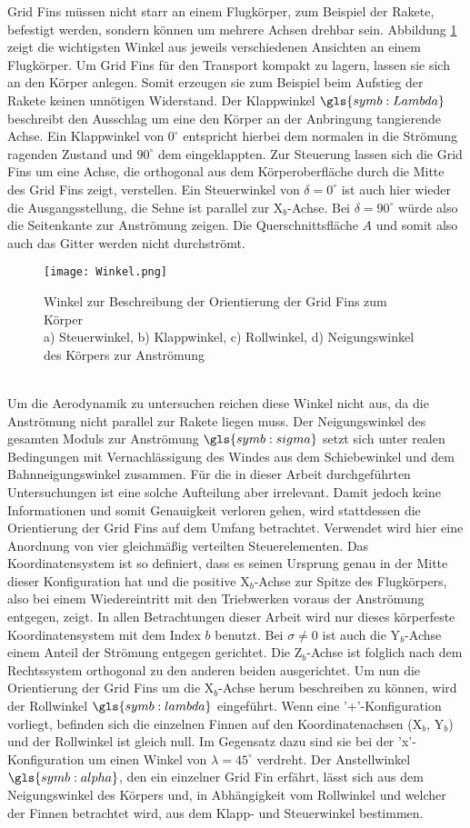 Grid Fins müssen nicht starr an einem Flugkörper, zum Beispiel der Rakete, befestigt werden, sondern können um mehrere Achsen drehbar sein. Abbildung \ref{abb_winkel} zeigt die wichtigsten Winkel aus jeweils verschiedenen Ansichten an einem Flugkörper. Um Grid Fins für den Transport kompakt zu lagern, lassen sie sich an den Körper anlegen. Somit erzeugen sie zum Beispiel beim Aufstieg der Rakete keinen unnötigen Widerstand. Der Klappwinkel $\gls{symb:Lambda}$ beschreibt den Ausschlag um eine den Körper an der Anbringung tangierende Achse. Ein Klappwinkel von $0^\circ$ entspricht hierbei dem normalen in die Strömung ragenden Zustand und $90^\circ$ dem eingeklappten. Zur Steuerung lassen sich die Grid Fins um eine Achse, die orthogonal aus dem Körperoberfläche durch die Mitte des Grid Fins zeigt, verstellen. Ein Steuerwinkel von $\delta = 0^\circ$ ist auch hier wieder die Ausgangsstellung, die Sehne ist parallel zur X$_b$-Achse. Bei $\delta = 90^\circ$ würde also die Seitenkante zur Anströmung zeigen. Die Querschnittsfläche $A$ und somit also auch das Gitter werden nicht durchströmt.
\begin{figure}[h]
	\centering
	\texttt{[image: Winkel.png]}
	\caption{Winkel zur Beschreibung der Orientierung der Grid Fins zum Körper\\a) Steuerwinkel, b) Klappwinkel, c) Rollwinkel, d) Neigungswinkel des Körpers zur Anströmung}
	\label{abb_winkel}
\end{figure}\\
Um die Aerodynamik zu untersuchen reichen diese Winkel nicht aus, da die Anströmung nicht parallel zur Rakete liegen muss. Der Neigungswinkel des gesamten Moduls zur Anströmung $\gls{symb:sigma}$ setzt sich unter realen Bedingungen mit Vernachlässigung des Windes aus dem Schiebewinkel und dem Bahnneigungswinkel zusammen. Für die in dieser Arbeit durchgeführten Untersuchungen ist eine solche Aufteilung aber irrelevant. Damit jedoch keine Informationen und somit Genauigkeit verloren gehen, wird stattdessen die Orientierung der Grid Fins auf dem Umfang betrachtet. Verwendet wird hier eine Anordnung von vier gleichmäßig verteilten Steuerelementen. Das Koordinatensystem ist so definiert, dass es seinen Ursprung genau in der Mitte dieser Konfiguration hat und die positive X$_b$-Achse zur Spitze des Flugkörpers, also bei einem Wiedereintritt mit den Triebwerken voraus der Anströmung entgegen, zeigt. In allen Betrachtungen dieser Arbeit wird nur dieses körperfeste Koordinatensystem mit dem Index $b$ benutzt. Bei $\sigma \neq 0$ ist auch die Y$_b$-Achse einem Anteil der Strömung entgegen gerichtet. Die Z$_b$-Achse ist folglich nach dem Rechtssystem orthogonal zu den anderen beiden ausgerichtet. Um nun die Orientierung der Grid Fins um die X$_b$-Achse herum beschreiben zu können, wird der Rollwinkel $\gls{symb:lambda}$ eingeführt. Wenn eine '+'-Konfiguration vorliegt, befinden sich die einzelnen Finnen auf den Koordinatenachsen (X$_b$, Y$_b$) und der Rollwinkel ist gleich null. Im Gegensatz dazu sind sie bei der 'x'-Konfiguration um einen Winkel von $\lambda = 45^\circ$ verdreht. Der Anstellwinkel $\gls{symb:alpha}$, den ein einzelner Grid Fin erfährt, lässt sich aus dem Neigungswinkel des Körpers und, in Abhängigkeit vom Rollwinkel und welcher der Finnen betrachtet wird, aus dem Klapp- und Steuerwinkel bestimmen.
